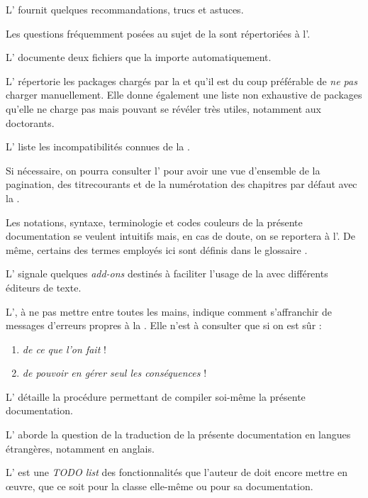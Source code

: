 L' fournit quelques recommandations, trucs et astuces.

Les questions fréquemment posées au sujet de la \yatCl{} sont répertoriées
à l'.

L' documente deux fichiers que la \yatCl{}
importe automatiquement.

L' répertorie les packages chargés par la \yatCl{} et
qu'il est du coup préférable de \emph{ne pas} charger manuellement. Elle donne
également une liste non exhaustive de packages qu'elle ne charge pas mais
pouvant se révéler très utiles, notamment aux doctorants.

L' liste les incompatibilités connues de la \yatCl{}.

Si nécessaire, on pourra consulter l' pour avoir une vue
d'ensemble de la \gls{pagination}, des \glspl{titrecourant} et de la
numérotation des chapitres par défaut avec la \yatCl{}.

Les notations, syntaxe, terminologie et codes couleurs de la présente
documentation se veulent intuitifs mais, en cas de doute, on se reportera
à l'. De même, certains des termes employés ici sont
définis dans le glossaire .

L' signale quelques \emph{add-ons} destinés à faciliter
l'usage de la \yatCl{} avec différents éditeurs de texte.

L', à ne pas mettre entre toutes les mains, indique
comment s'affranchir de messages d'erreurs propres à la \yatCl{}. Elle n'est
à consulter que si on est sûr :
\begin{enumerate}
\item \emph{de ce que l'on fait} !
\item \emph{de pouvoir en gérer \emph{seul} les conséquences} !
\end{enumerate}

L' détaille la procédure permettant de compiler
soi-même la présente documentation.

L' aborde la question de la traduction de la présente
documentation en langues étrangères, notamment en anglais.

L' est une \emph{TODO list} des fonctionnalités que
l'auteur de \yatcl{} doit encore mettre en œuvre, que ce soit pour la classe
elle-même ou pour sa documentation.

